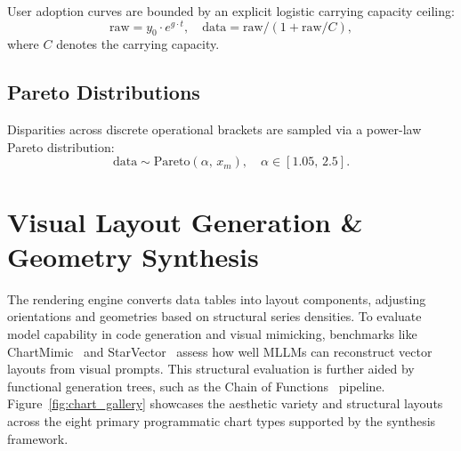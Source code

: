 \documentclass[11pt,twocolumn]{article}
\begin{document}
User adoption curves are bounded by an explicit logistic carrying capacity ceiling:
\begin{equation}\label{eq:satgrowth}
  \text{raw} = y_0 \cdot e^{g \cdot t}, \quad \text{data} = \text{raw} / (1 + \text{raw}/C),
\end{equation}
where $C$ denotes the carrying capacity.

\subsection{Pareto Distributions}\label{sec:pareto}

Disparities across discrete operational brackets are sampled via a power-law Pareto distribution:
\begin{equation}\label{eq:pareto}
  \text{data} \sim \text{Pareto}(\alpha,\, x_m), \quad \alpha \in [1.05,\, 2.5].
\end{equation}

\section{Visual Layout Generation \& Geometry Synthesis}\label{sec:layout}

The rendering engine converts data tables into layout components, adjusting orientations and geometries based on structural series densities.
To evaluate model capability in code generation and visual mimicking, benchmarks like ChartMimic~\cite{yang2025chartmimic} and StarVector~\cite{rodriguez2025starvector} assess how well MLLMs can reconstruct vector layouts from visual prompts.
This structural evaluation is further aided by functional generation trees, such as the Chain of Functions~\cite{wang2025chainoffunctions} pipeline.
Figure~\ref{fig:chart_gallery} showcases the aesthetic variety and structural layouts across the eight primary programmatic chart types supported by the synthesis framework.
\end{document}
